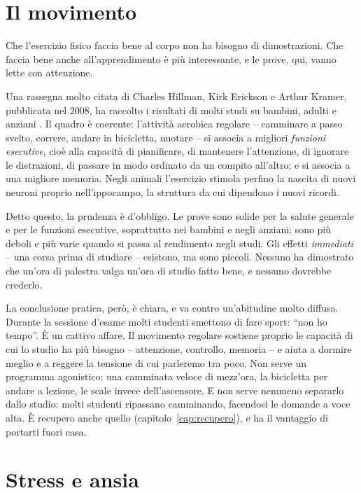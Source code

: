 \section{Il movimento}

Che l'esercizio fisico faccia bene al corpo non ha bisogno di
dimostrazioni. Che faccia bene anche all'apprendimento è più
interessante, e le prove, qui, vanno lette con attenzione.

Una rassegna molto citata di Charles Hillman, Kirk Erickson e Arthur
Kramer, pubblicata nel 2008, ha raccolto i risultati di molti studi su
bambini, adulti e anziani \parencite{hillman2008}. Il quadro è
coerente: l'attività aerobica regolare -- camminare a passo svelto,
correre, andare in bicicletta, nuotare -- si associa a migliori
\emph{funzioni esecutive}, cioè alla capacità di pianificare, di
mantenere l'attenzione, di ignorare le distrazioni, di passare in modo
ordinato da un compito all'altro; e si associa a una migliore memoria.
Negli animali l'esercizio stimola perfino la nascita di nuovi neuroni
proprio nell'ippocampo, la struttura da cui dipendono i nuovi ricordi.

Detto questo, la prudenza è d'obbligo. Le prove sono solide per la
salute generale e per le funzioni esecutive, soprattutto nei bambini e
negli anziani; sono più deboli e più varie quando si passa al
rendimento negli studi. Gli effetti \emph{immediati} -- una corsa prima
di studiare -- esistono, ma sono piccoli. Nessuno ha dimostrato che
un'ora di palestra valga un'ora di studio fatto bene, e nessuno
dovrebbe crederlo.

La conclusione pratica, però, è chiara, e va contro un'abitudine molto
diffusa. Durante la sessione d'esame molti studenti smettono di fare
sport: \enquote{non ho tempo}. È un cattivo affare. Il movimento
regolare sostiene proprio le capacità di cui lo studio ha più bisogno
-- attenzione, controllo, memoria -- e aiuta a dormire meglio e a
reggere la tensione di cui parleremo tra poco. Non serve un programma
agonistico: una camminata veloce di mezz'ora, la bicicletta per andare
a lezione, le scale invece dell'ascensore. E non serve nemmeno
separarlo dallo studio: molti studenti ripassano camminando, facendosi
le domande a voce alta. È recupero anche quello
(capitolo~\ref{cap:recupero}), e ha il vantaggio di portarti fuori
casa.

\section{Stress e ansia}

